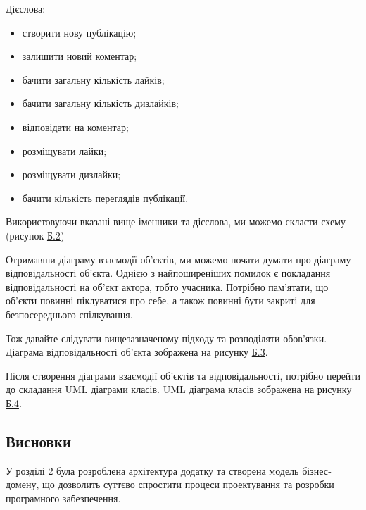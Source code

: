 Дієслова:
\begin{itemize}
		\item створити нову публікацію;
		\item залишити новий коментар;
		\item бачити загальну кількість лайків;
		\item бачити загальну кількість дизлайків;
		\item відповідати на коментар;
		\item розміщувати лайки;
		\item розміщувати дизлайки;
		\item бачити кількість переглядів публікації.
\end{itemize}

Використовуючи вказані вище іменники та дієслова, ми можемо скласти схему (рисунок \hyperref[b2]{Б.2})

Отримавши діаграму взаємодії об'єктів, ми можемо почати думати про діаграму відповідальності об'єкта.
Однією з найпоширеніших помилок є покладання відповідальності на об'єкт актора, тобто учасника.
Потрібно пам'ятати, що об'єкти повинні піклуватися про себе,
а також повинні бути закриті для безпосереднього спілкування.

Тож давайте слідувати вищезазначеному підходу та розподіляти обов'язки.
Діаграма відповідальності об'єкта зображена на рисунку \hyperref[b3]{Б.3}.

Після створення діаграми взаємодії об’єктів та відповідальності,
потрібно перейти до складання UML діаграми класів.
UML діаграма класів зображена на рисунку \hyperref[b4]{Б.4}.


\subsection{Висновки}

У розділі 2 була розроблена архітектура додатку та створена модель бізнес­домену,
що дозволить суттєво спростити процеси проектування та розробки програмного забезпечення.
